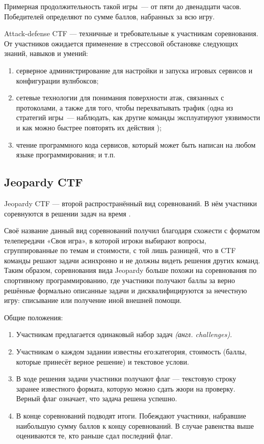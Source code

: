 Примерная продолжительность такой игры~--- от пяти до двенадцати часов. Победителей определяют по сумме баллов, набранных за всю игру.

Attack-defense CTF — техничные и требовательные к участникам соревнования. От участников ожидается применение в стрессовой обстановке следующих знаний, навыков и умений:
\begin{enumerate}
  \item серверное администрирование для настройки и запуска игровых сервисов и конфигурации вулнбоксов;
  \item сетевые технологии для понимания поверхности атак, связанных с протоколами, а также для того, чтобы перехватывать трафик (одна из стратегий игры~--- наблюдать, как другие команды эксплуатируют уязвимости и как можно быстрее повторять их действия \cite{ReplayAttacks});
  \item чтение программного кода сервисов, который может быть написан на любом языке программирования; и т.п.
\end{enumerate}



\subsection{Jeopardy CTF}
\label{cha:analysis:Jeopardy}

Jeopardy CTF — второй распространённый вид соревнований. В нём участники соревнуются в решении задач на время \cite{Course}.

Своё название данный вид соревнований получил благодаря схожести с форматом телепередачи «Своя игра», в которой игроки выбирают вопросы, сгруппированные по темам и стоимости, с той лишь разницей, что в CTF команды решают задачи асинхронно и не должны видеть решения других команд. Таким образом, соревнования вида Jeopardy больше похожи на соревнования по спортивному программированию, где участники получают баллы за верно решённые формально описанные задачи и дисквалифицируются за нечестную игру: списывание или получение иной внешней помощи.

Общие положения:

\begin{enumerate}
  \item Участникам предлагается одинаковый набор задач \textit{(англ. challenges)}.
  \item Участникам о каждом задании известны его:категория, стоимость (баллы, которые принесёт верное решение) и текстовое услови.
  \item В ходе решения задачи участники получают флаг — текстовую строку заранее известного формата, которую можно сдать жюри на проверку. Верный флаг означает, что задача решена успешно.
  \item В конце соревнований подводят итоги. Побеждают участники, набравшие наибольшую сумму баллов к концу соревнований. В случае равенства выше оцениваются те, кто раньше сдал последний флаг.
\end{enumerate}

